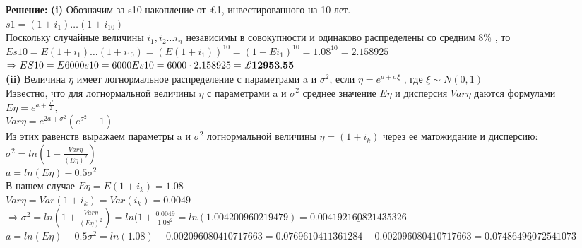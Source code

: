 \documentclass{article}
\begin{document}
{ \bf \large Решение:}
{\bf \large  (i)}  
Обозначим за s10 накопление от \pounds 1, инвестированного на 10 лет.\\

$s1= (1+i_1) \dots (1+i_10)$\\

 Поскольку  случайные величины $i_1, i_2 \dots i_n $ независимы в совокупности  и одинаково распределены со средним 8\% , то \\

$Es10 = E(1+i_1)\dots (1+i_{10}) = (E(1+i_1))^{10} = (1+Ei_1)^{10} = 1.08^{10} = 2.158925$\\

$\Rightarrow ES10 = E6000s10 = 6000Es10 = 6000\cdot  2.158925 = \bf \pounds 12953.55$\\


{\bf \large  (ii)}  Величина $\eta $ имеет логнормальное распределение с параметрами a и $\sigma^2$, 
если $\eta  = e^ {a+\sigma \xi }$  , где  $\xi  \sim  N(0,1)$\\

Известно, что для логнормальной величины $\eta$ с параметрами a и $\sigma^2$ среднее значение $E\eta$ и дисперсия $Var\eta$ даются формулами \\

$ \boxed {E\eta = e^{a+ \frac {\sigma^2} {2}}}, $\\
$ \boxed {Var\eta = e^{2a + \sigma^2}(e^{\sigma^2 }- 1)}$\\

Из этих равенств выражаем параметры a и $\sigma^2$ логнормальной величины  $\eta=(1+i_k)$  через ее матожидание и дисперсию:\\

$ \boxed {\sigma^2 = ln(1+\frac{Var\eta}{ (E\eta)^2})}$\\

$\boxed {a = ln(E\eta) - 0.5\sigma^2}$\\

В нашем случае $E\eta=E(1+i_k)  = 1.08$\\

$Var\eta= Var(1+i_k) = Var(i_k) = 0.0049$\\

$\Rightarrow  \sigma^2 = ln(1+\frac{Var\eta}{ (E\eta)^2}) = ln(1 + \frac{0.0049}{ 1.08^2} = ln(1.004200960219479) = \underline {0.004192160821435326}$\\

$ a = ln(E\eta) - 0.5\sigma^2= ln(1.08) - 0.002096080410717663= 0.0769610411361284- 0.002096080410717663=  \underline {0.07486496072541073}$\\
\end{document}
